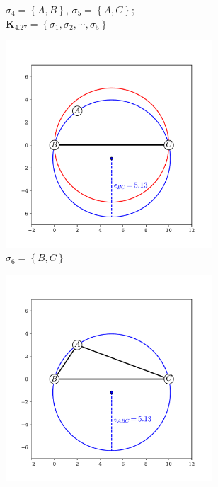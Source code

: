 \begin{figure}[tb]
\begin{subfigure}[b]{0.45\textwidth}
        \caption{$\sigma_4=\left\{A,B\right\}$, $\sigma_5=\left\{A,C\right\}$; \\ $\mathbf{K}_{4.27} = \left\{\sigma_1,\sigma_2,\cdots,\sigma_5\right\}$}
         \label{fig:phalphab1}
     \end{subfigure}
     \hfill
        
      \vspace{0.5cm}
      \begin{subfigure}[b]{0.45\textwidth}
         \centering
         \includegraphics[width=0.85\textwidth]{./figures/ph/alpha_b1.pdf}
         \caption{$\sigma_6=\left\{B,C\right\}$ \\ \phantom{x}}
         \label{fig:phalphab2}
     \end{subfigure}
     \hfill
      \begin{subfigure}[b]{0.45\textwidth}
         \centering
         \includegraphics[width=0.85\textwidth]{./figures/ph/alpha_c.pdf}

\end{subfigure}
\end{figure}

